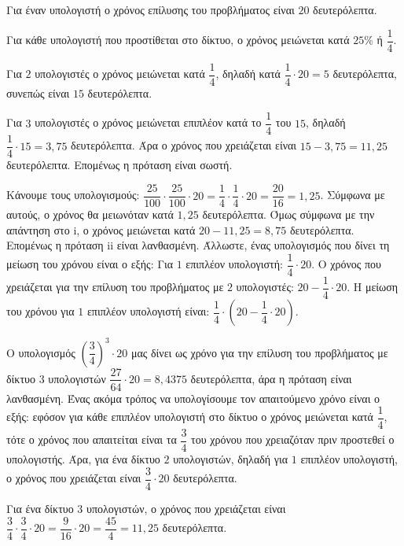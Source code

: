
\begin{alist}
\item
\begin{rlist}
\item Για έναν υπολογιστή ο χρόνος επίλυσης του προβλήματος είναι $20$ δευτερόλεπτα.

Για κάθε υπολογιστή που προστίθεται στο δίκτυο, ο χρόνος μειώνεται κατά $25\%$ ή $\dfrac{1}{4}$.

Για $2$ υπολογιστές ο χρόνος μειώνεται κατά $\dfrac{1}{4}$, δηλαδή κατά $\dfrac{1}{4} \cdot 20 = 5$ δευτερόλεπτα,
συνεπώς είναι $15$ δευτερόλεπτα.

Για $3$ υπολογιστές ο χρόνος μειώνεται επιπλέον κατά το $\dfrac{1}{4}$ του $15$, δηλαδή $\dfrac{1}{4} \cdot 15 = 3,75$
δευτερόλεπτα.
Άρα ο χρόνος που χρειάζεται είναι $15 - 3,75 = 11,25$ δευτερόλεπτα.
Επομένως η πρόταση είναι σωστή.

\item Κάνουμε τους υπολογισμούς: $\dfrac{25}{100} \cdot \dfrac{25}{100} \cdot 20 = \dfrac{1}{4} \cdot \dfrac{1}{4} \cdot 20 = \dfrac{20}{16} = 1,25$. Σύμφωνα με αυτούς, ο
χρόνος θα μειωνόταν κατά $1,25$ δευτερόλεπτα. Όμως σύμφωνα με την απάντηση στο i,
ο χρόνος μειώνεται κατά $20 - 11,25 = 8,75$ δευτερόλεπτα.
Επομένως η πρόταση ii είναι λανθασμένη.
Άλλωστε, ένας υπολογισμός που δίνει τη μείωση του χρόνου είναι ο εξής:
Για $1$ επιπλέον υπολογιστή: $\dfrac{1}{4} \cdot 20$.
Ο χρόνος που χρειάζεται για την επίλυση του προβλήματος με $2$ υπολογιστές:
$20 - \dfrac{1}{4} \cdot 20$.
Η μείωση του χρόνου για $1$ επιπλέον υπολογιστή είναι: $\dfrac{1}{4} \cdot (20 - \dfrac{1}{4} \cdot 20)$.

\item Ο υπολογισμός $\left(\dfrac{3}{4}\right)^3 \cdot 20$ μας δίνει ως χρόνο για την επίλυση του προβλήματος με
δίκτυο $3$ υπολογιστών $\dfrac{27}{64} \cdot 20 = 8,4375$ δευτερόλεπτα, άρα η πρόταση είναι
λανθασμένη.
Ένας ακόμα τρόπος να υπολογίσουμε τον απαιτούμενο χρόνο είναι ο εξής:
εφόσον για κάθε επιπλέον υπολογιστή στο δίκτυο ο χρόνος μειώνεται κατά $\dfrac{1}{4}$, τότε ο
χρόνος που απαιτείται είναι τα $\dfrac{3}{4}$ του χρόνου που χρειαζόταν πριν προστεθεί ο
υπολογιστής.
Άρα, για ένα δίκτυο $2$ υπολογιστών, δηλαδή για $1$ επιπλέον υπολογιστή, ο χρόνος που
χρειάζεται είναι $\dfrac{3}{4} \cdot 20$ δευτερόλεπτα.

Για ένα δίκτυο $3$ υπολογιστών, ο χρόνος που χρειάζεται είναι $\dfrac{3}{4} \cdot \dfrac{3}{4} \cdot 20 = \dfrac{9}{16} \cdot 20 = \dfrac{45}{4} = 11,25$
δευτερόλεπτα.
\end{rlist}


\end{alist}
